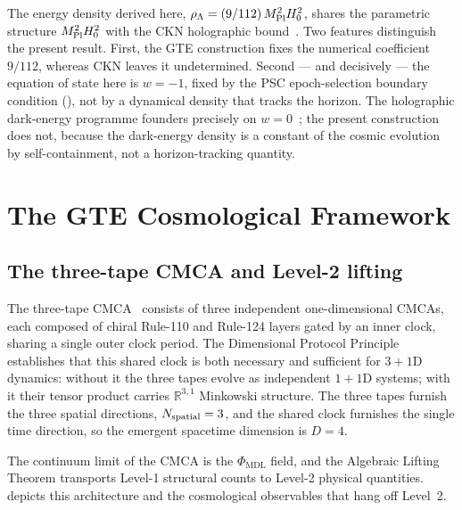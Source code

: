 \documentclass[11pt]{article}
\theoremstyle{remark}
\newcommand{\PHIMDL}{\Phi_{\mathrm{MDL}}}
\newcommand{\RR}{\mathbb{R}}
\newcommand{\MPl}{M_{\rm Pl}}
\newcommand{\Hnought}{H_0}
\newcommand{\CMCA}{\text{CMCA}}
\begin{document}
The energy density derived here, $\rho_\Lambda = (9/112)\,\MPl^2\Hnought^2$, shares
the parametric structure $\MPl^2\Hnought^2$ with the CKN holographic
bound~\cite{CohenKaplanNelson1999}. Two features distinguish the present result.
First, the GTE construction fixes the numerical coefficient $9/112$, whereas CKN
leaves it undetermined. Second --- and decisively --- the equation of state here is
$w = -1$, fixed by the PSC epoch-selection boundary condition
(), not by a dynamical density that tracks the horizon. The
holographic dark-energy programme founders precisely on $w = 0$~\cite{Hsu2004};
the present construction does not, because the dark-energy density is a constant of
the cosmic evolution by self-containment, not a horizon-tracking quantity.

\section{The GTE Cosmological Framework}
\label{sec:framework}

\subsection{The three-tape CMCA and Level-2 lifting}

The three-tape $\CMCA$~\cite{SpivackThreeTapeCMCA} consists of three independent
one-dimensional $\CMCA$s, each composed of chiral Rule-110 and Rule-124 layers
gated by an inner clock, sharing a single outer clock period. The Dimensional
Protocol Principle establishes that this shared clock is both necessary and
sufficient for $3{+}1$D dynamics: without it the three tapes evolve as independent
$1{+}1$D systems; with it their tensor product carries $\RR^{3,1}$ Minkowski
structure. The three tapes furnish the three spatial directions, $N_{\rm spatial}
= 3$, and the shared clock furnishes the single time direction, so the emergent
spacetime dimension is $D = 4$.

The continuum limit of the $\CMCA$ is the $\PHIMDL$ field, and the Algebraic
Lifting Theorem transports Level-1 structural counts to Level-2 physical
quantities.  depicts this architecture and the cosmological
observables that hang off Level~2.
\end{document}
